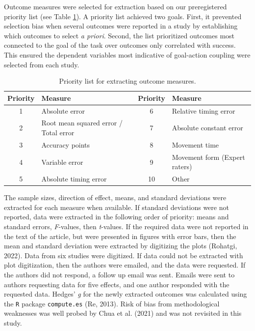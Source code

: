 \documentclass[
  man, donotrepeattitle,floatsintext]{apa7}
\begin{document}
Outcome measures were selected for extraction based on our preregistered priority list (see Table \ref{tab:table1}). A priority list achieved two goals. First, it prevented selection bias when several outcomes were reported in a study by establishing which outcomes to select \emph{a priori}. Second, the list prioritized outcomes most connected to the goal of the task over outcomes only correlated with success. This ensured the dependent variables most indicative of goal-action coupling were selected from each study.

\begin{table}

\caption{\label{tab:table1}Priority list for extracting outcome measures.}
\fontsize{10}{12}\selectfont
\begin{tabular}[t]{clcl}
\toprule
Priority & Measure & Priority & Measure\\
\midrule
1 & Absolute error & 6 & Relative timing error\\
2 & Root mean squared error / Total error & 7 & Absolute constant error\\
3 & Accuracy points & 8 & Movement time\\
4 & Variable error & 9 & Movement form (Expert raters)\\
5 & Absolute timing error & 10 & Other\\
\bottomrule
\end{tabular}
\end{table}

The sample sizes, direction of effect, means, and standard deviations were extracted for each measure when available. If standard deviations were not reported, data were extracted in the following order of priority: means and standard errors, \emph{F}-values, then \emph{t}-values. If the required data were not reported in the text of the article, but were presented in figures with error bars, then the mean and standard deviation were extracted by digitizing the plots (Rohatgi, 2022). Data from six studies were digitized. If data could not be extracted with plot digitization, then the authors were emailed, and the data were requested. If the authors did not respond, a follow up email was sent. Emails were sent to authors requesting data for five effects, and one author responded with the requested data. Hedges' \emph{g} for the newly extracted outcomes was calculated using the \texttt{R} package \texttt{compute.es} (Re, 2013). Risk of bias from methodological weaknesses was well probed by Chua et al. (2021) and was not revisited in this study.
\end{document}
